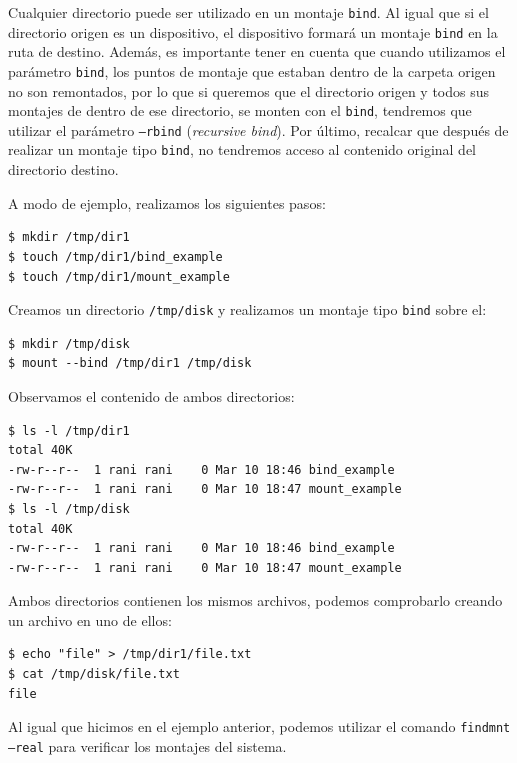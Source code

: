 \documentclass[a4paper, oneside, 12pt]{book}
\begin{document}
	\noindent Cualquier directorio puede ser utilizado en un montaje \texttt{bind}. Al igual que si el directorio origen es un dispositivo, el dispositivo formará un montaje \texttt{bind} en la ruta de destino. Además, es importante tener en cuenta que cuando utilizamos el parámetro \texttt{bind}, los puntos de montaje que estaban dentro de la carpeta origen no son remontados, por lo que si queremos que el directorio origen y todos sus montajes de dentro de ese directorio, se monten con el \texttt{bind}, tendremos que utilizar el parámetro \texttt{--rbind} (\textit{recursive bind}). Por último, recalcar que después de realizar un montaje tipo \texttt{bind}, no tendremos acceso al contenido original del directorio destino. \\
	
	\pagebreak
	
	\noindent A modo de ejemplo, realizamos los siguientes pasos:
	
	\begin{verbatim}
$ mkdir /tmp/dir1
$ touch /tmp/dir1/bind_example
$ touch /tmp/dir1/mount_example
	\end{verbatim}

	\noindent Creamos un directorio \texttt{/tmp/disk} y realizamos un montaje tipo \texttt{bind} sobre el:
	
	\begin{verbatim}
$ mkdir /tmp/disk
$ mount --bind /tmp/dir1 /tmp/disk
	\end{verbatim}

	\noindent Observamos el contenido de ambos directorios:
	
	\begin{verbatim}
$ ls -l /tmp/dir1
total 40K
-rw-r--r--  1 rani rani    0 Mar 10 18:46 bind_example
-rw-r--r--  1 rani rani    0 Mar 10 18:47 mount_example
$ ls -l /tmp/disk
total 40K
-rw-r--r--  1 rani rani    0 Mar 10 18:46 bind_example
-rw-r--r--  1 rani rani    0 Mar 10 18:47 mount_example
	\end{verbatim}

	\noindent Ambos directorios contienen los mismos archivos, podemos comprobarlo creando un archivo en uno de ellos:
	
	\begin{verbatim}
$ echo "file" > /tmp/dir1/file.txt
$ cat /tmp/disk/file.txt
file
	\end{verbatim}

	\noindent Al igual que hicimos en el ejemplo anterior, podemos utilizar el comando \texttt{findmnt --real} para verificar los montajes del sistema.
	
\end{document}
